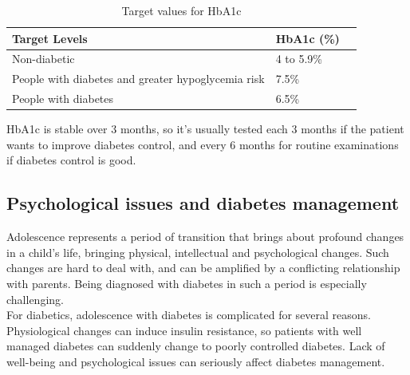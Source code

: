 \begin{table}
    \begin{tabular}{|l|l|l|}
    \hline
    Target Levels & HbA1c (\%) \\ \hline
    Non-diabetic          & 4 to 5.9\%                    \\ 
    People with diabetes and greater hypoglycemia risk           & 7.5\%    \\ 
    People with diabetes       & 6.5\%                     \\ 
    \hline
    \end{tabular}
    
    \caption{Target values for HbA1c}
    \label{table:hba1cValues}
\end{table}


HbA1c is stable over 3 months, so it's usually tested each 3 months if the patient wants to improve diabetes control, and every 6 months for routine examinations if diabetes control is good.



\subsection{Psychological issues and diabetes management}

Adolescence represents a period of transition that brings about %
profound changes in a child's life, bringing physical, intellectual and psychological changes. Such changes are hard to deal with, and can be amplified by a conflicting relationship with parents. Being diagnosed with diabetes in such a period is especially challenging.
\\
For diabetics, adolescence with diabetes is complicated for several reasons. Physiological changes can induce insulin resistance, so patients with well managed diabetes can suddenly change to poorly controlled diabetes. Lack of well-being and psychological issues can seriously affect diabetes management. 
\\
